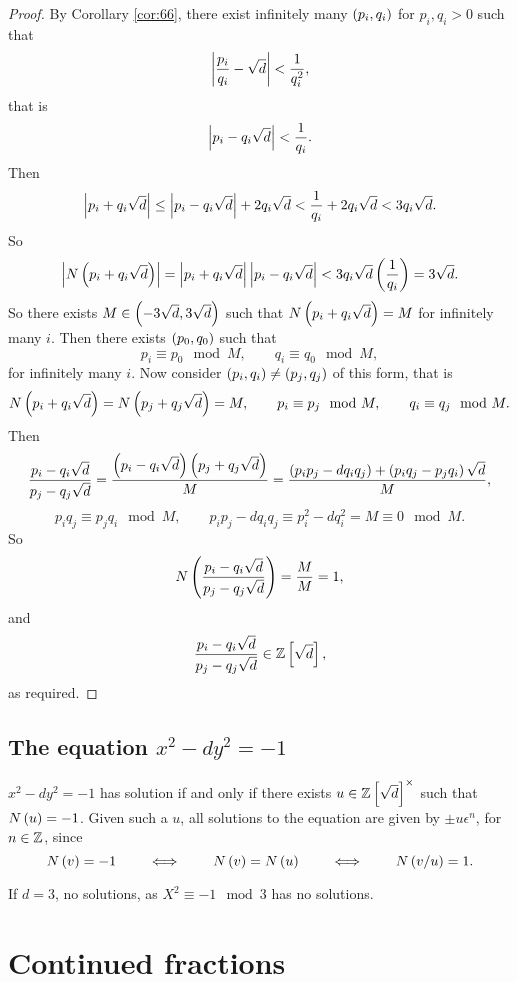 \begin{proof}
By Corollary \ref{cor:66}, there exist infinitely many $ \left( p_i, q_i \right) $ for $ p_i, q_i > 0 $ such that
$$ \left\lvert \dfrac{p_i}{q_i} - \sqrt{d} \right\rvert < \dfrac{1}{q_i^2}, $$
that is
$$ \left\lvert p_i - q_i\sqrt{d} \right\rvert < \dfrac{1}{q_i}. $$
Then
$$ \left\lvert p_i + q_i\sqrt{d} \right\rvert \le \left\lvert p_i - q_i\sqrt{d} \right\rvert + 2q_i\sqrt{d} < \dfrac{1}{q_i} + 2q_i\sqrt{d} < 3q_i\sqrt{d}. $$
So
$$ \left\lvert N\left( p_i + q_i\sqrt{d} \right) \right\rvert = \left\lvert p_i + q_i\sqrt{d} \right\rvert\left\lvert p_i - q_i\sqrt{d} \right\rvert < 3q_i\sqrt{d}\left( \dfrac{1}{q_i} \right) = 3\sqrt{d}. $$
So there exists $ M \in \left( -3\sqrt{d}, 3\sqrt{d} \right) $ such that $ N\left( p_i + q_i\sqrt{d} \right) = M $ for infinitely many $ i $. Then there exists $ \left( p_0, q_0 \right) $ such that
$$ p_i \equiv p_0 \mod M, \qquad q_i \equiv q_0 \mod M, $$
for infinitely many $ i $. Now consider $ \left( p_i, q_i \right) \ne \left( p_j, q_j \right) $ of this form, that is
$$ N\left( p_i + q_i\sqrt{d} \right) = N\left( p_j + q_j\sqrt{d} \right) = M, \qquad p_i \equiv p_j \mod M, \qquad q_i \equiv q_j \mod M. $$
Then
$$ \dfrac{p_i - q_i\sqrt{d}}{p_j - q_j\sqrt{d}} = \dfrac{\left( p_i - q_i\sqrt{d} \right)\left( p_j + q_j\sqrt{d} \right)}{M} = \dfrac{\left( p_ip_j - dq_iq_j \right) + \left( p_iq_j - p_jq_i \right)\sqrt{d}}{M}, $$
$$ p_iq_j \equiv p_jq_i \mod M, \qquad p_ip_j - dq_iq_j \equiv p_i^2 - dq_i^2 = M \equiv 0 \mod M. $$
So
$$ N\left( \dfrac{p_i - q_i\sqrt{d}}{p_j - q_j\sqrt{d}} \right) = \dfrac{M}{M} = 1, $$
and
$$ \dfrac{p_i - q_i\sqrt{d}}{p_j - q_j\sqrt{d}} \in \mathbb{Z}\left[ \sqrt{d} \right], $$
as required.
\end{proof}


\subsection{The equation $ x^2 - dy^2 = - 1 $}

$ x^2 - dy^2 = -1 $ has solution if and only if there exists $ u \in \mathbb{Z}\left[ \sqrt{d} \right]^\times $ such that $ N\left( u \right) = -1 $. Given such a $ u $, all solutions to the equation are given by $ \pm u\epsilon^n $, for $ n \in \mathbb{Z} $, since
$$ N\left( v \right) = -1 \qquad \iff \qquad N\left( v \right) = N\left( u \right) \qquad \iff \qquad N\left( v / u \right) = 1. $$

\begin{example*}
If $ d = 3 $, no solutions, as $ X^2 \equiv -1 \mod 3 $ has no solutions.
\end{example*}

\pagebreak

\section{Continued fractions}

